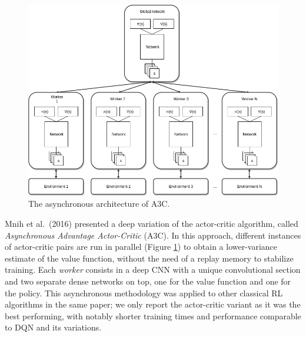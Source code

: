 %
%
\begin{figure}
    \includegraphics[width=\textwidth]{pictures/a3c}
    \centering
    \caption[The asynchronous architecture of A3C]{The asynchronous architecture
	    of A3C.}
    \label{f:a3c}
\end{figure}
%
Mnih et al.\ (2016) \cite{mnih2016asynchronous} presented a deep variation of 
the actor-critic algorithm, called \textit{Asynchronous Advantage Actor-Critic} 
(A3C). In this approach, different instances of actor-critic pairs are run in 
parallel (Figure \ref{f:a3c}) to obtain a lower-variance estimate of the value 
function, without the need of a replay memory to stabilize training. 
Each \textit{worker} consists in a deep CNN with a unique convolutional section 
and two separate dense networks on top, one for the value function and one for 
the policy. 
This asynchronous methodology was applied to other classical RL algorithms in 
the same paper; we only report the actor-critic variant as it was the best 
performing, with notably shorter training times and performance comparable 
to DQN and its variations.

